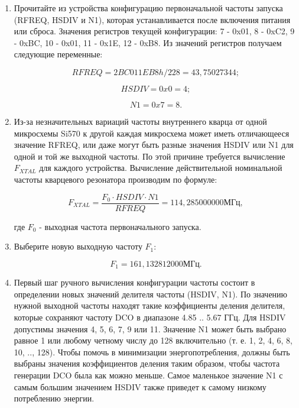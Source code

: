 \documentclass[a4paper,oneside ,14pt]{extreport}
\begin{document}
\begin{enumerate}
	\item Прочитайте из устройства конфигурацию первоначальной частоты запуска (RFREQ, HSDIV и N1), которая устанавливается после включения питания или сброса. Значения регистров текущей конфигурации: 7 - 0x01, 8 - 0xC2, 9 - 0xBC, 10 - 0x01,
	11 - 0x1E, 12 - 0xB8. Из значений регистров получаем следующие переменные:

	\begin{equation}	
		RFREQ = 2BC011EB8h / 228 = 43,75027344;
	\end{equation}
	
	\begin{equation}	
		HSDIV = 0x0 = 4;
	\end{equation}
	
	\begin{equation}	
		N1    = 0x7 = 8.
	\end{equation}

	\item Из-за незначительных вариаций частоты внутреннего кварца от одной микросхемы Si570 к другой каждая микросхема может иметь отличающееся значение RFREQ, или даже могут быть разные значения HSDIV или N1 для одной и той же выходной частоты. По этой причине требуется вычисление \(F_{XTAL}\) для каждого устройства. Вычисление действительной номинальной частоты кварцевого резонатора производим по формуле:

	\begin{equation}	
		F_{XTAL} = \frac{F_{0} \cdot HSDIV \cdot N1}{RFREQ} = 114,285000000 МГц,
	\end{equation}

	где \(F_{0}\) - выходная частота первоначального запуска.

	\item Выберите новую выходную частоту \(F_{1}\):

	\begin{equation}	
		F_{1} = 161,132812000 МГц.
	\end{equation}

	\item Первый шаг ручного вычисления конфигурации частоты состоит в определении новых значений делителя частоты (HSDIV, N1). По значению нужной выходной частоты находят такие коэффициенты деления делителя, которые сохраняют частоту DCO в диапазоне 4.85 .. 5.67 ГГц. Для HSDIV допустимы значения 4, 5, 6, 7, 9 или 11. Значение N1 может быть выбрано равное 1 или любому четному числу до 128 включительно (т. е. 1, 2, 4, 6, 8, 10, .., 128). Чтобы помочь в минимизации энергопотребления, должны быть выбраны значения коэффициентов деления таким образом, чтобы частота генерации DCO была как можно меньше. Самое маленькое значение N1 с самым большим значением HSDIV также приведет к самому низкому потреблению энергии.


\end{enumerate}
\end{document}
